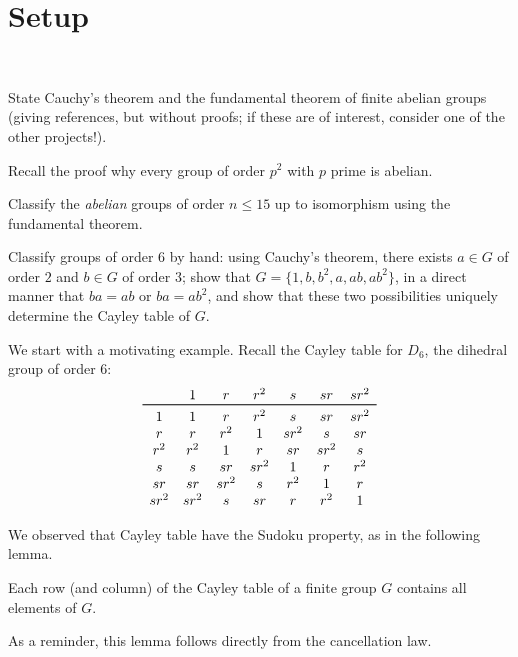 \section{Setup}~\label{sec:setup}

\begin{Answer}
  \begin{enumalph}
    \item State Cauchy's theorem and the fundamental theorem of finite abelian groups 
      (giving references, but without proofs; if these are of interest, consider one of 
      the other projects!).  
    \item Recall the proof why every group of order $p^2$ with $p$ prime is abelian.  
    \item Classify the \emph{abelian} groups of order $n \leq 15$ up to isomorphism 
    using the fundamental theorem.
    \item Classify groups of order $6$ by hand: using Cauchy's theorem, there exists $a
    \in G$ of order $2$ and $b \in G$ of order $3$;
      show that $G=\{1,b,b^2,a,ab,ab^2\}$, in a direct manner that
      $ba=ab$ or $ba=ab^2$, and show that these two possibilities uniquely determine
      the Cayley table of $G$.
  \end{enumalph}
\end{Answer}


We start with a motivating example.  Recall the Cayley table for $D_6$, the dihedral group of order $6$:
\[ \begin{array}{c  cccccccc} 
& 1 & r & r^2 & s & sr & sr^2 \\
\toprule
1 & 1 & r & r^2 & s & sr & sr^2 \\
r & r & r^2 & 1 & sr^2 & s & sr \\
r^2 & r^2 & 1 & r & sr & sr^2 & s \\
s & s & sr & sr^2 & 1 & r & r^2 \\
sr & sr & sr^2 & s & r^2 & 1 & r \\
sr^2 & sr^2 & s & sr & r & r^2 & 1
\end{array} \]

We observed that Cayley table have the Sudoku property, as in the following lemma.

\begin{lem}
Each row (and column) of the Cayley table of a finite group $G$ contains all elements of $G$.
\end{lem}

As a reminder, this lemma follows directly from the cancellation law.


